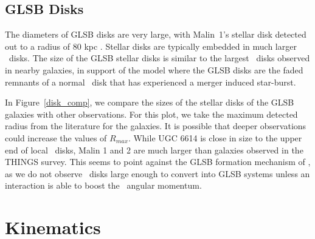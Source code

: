 \documentclass{emulateapj}
\newcommand\HI{\ion{H}{1}}
\begin{document}
\subsection{GLSB Disks}\label{sec:disks}

The diameters of GLSB disks are very large, with Malin~1's stellar disk detected out to a radius of 80 kpc \citep{Galaz15}.  Stellar disks are typically embedded in much larger \HI\ disks.  The size of the GLSB stellar disks is similar to the largest \HI\ disks observed in nearby galaxies, in support of the \citet{Mapelli08} model where the GLSB disks are the faded remnants of a normal \HI\ disk that has experienced a merger induced star-burst.  



In Figure~\ref{disk_comp}, we compare the sizes of the stellar disks of the GLSB galaxies with other observations.  For this plot, we take the maximum detected radius from the literature for the galaxies.  It is possible that deeper observations could increase the values of $R_{max}$.  While UGC 6614 is close in size to the upper end of local \HI\ disks, Malin 1 and 2 are much larger than galaxies observed in the THINGS survey.  This seems to point against the GLSB formation mechanism of \citet{Mapelli08}, as we do not observe \HI\ disks large enough to convert into GLSB systems unless an interaction is able to boost the \HI\ angular momentum.

\begin{figure*}
\caption{ Comparison of the GLSB disks with other galaxy disks from the literature.  THINGS data taken from \citet{DeBlok2008}, Malin 1 from \citet{Galaz15}, Malin 2 and UGC 6614 from \citet{Pickering97}, \citet{Kasparova14}, and this paper.  Here, $R_{max}$ is the maximum radius with an \HI\ detection for the THINGS galaxies.  For the gLSB galaxies, the solid points show the maximum \HI\ detection radius and stars show the maximum detected stellar light radius.  These are all maximum detection radii, and thus should be considered lower limits.   \label{disk_comp}}
\end{figure*}


\section{Kinematics}\label{sec:kinematics}
\end{document}
